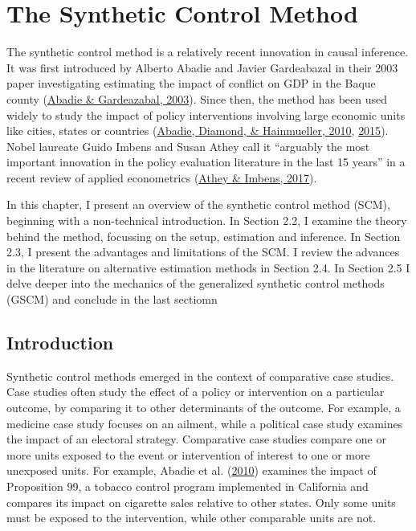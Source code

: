 \documentclass[12pt,nobind, a4paper]{reedthesis}
\begin{document}
 \hypertarget{the-synthetic-control-method}{%
 \chapter{The Synthetic Control Method}\label{the-synthetic-control-method}}

 The synthetic control method is a relatively recent innovation in causal inference. It was first introduced by Alberto Abadie and Javier Gardeabazal in their 2003 paper investigating estimating the impact of conflict on GDP in the Baque county (\protect\hyperlink{ref-abadie_economic_2003}{Abadie \& Gardeazabal, 2003}). Since then, the method has been used widely to study the impact of policy interventions involving large economic units like cities, states or countries (\protect\hyperlink{ref-abadie_synthetic_2010}{Abadie, Diamond, \& Hainmueller, 2010}, \protect\hyperlink{ref-abadie_comparative_2015}{2015}). Nobel laureate Guido Imbens and Susan Athey call it ``arguably the most important innovation in the policy evaluation literature in the last 15 years'' in a recent review of applied econometrics (\protect\hyperlink{ref-athey_state_2017}{Athey \& Imbens, 2017}).
 \linebreak

 In this chapter, I present an overview of the synthetic control method (SCM), beginning with a non-technical introduction. In Section 2.2, I examine the theory behind the method, focussing on the setup, estimation and inference. In Section 2.3, I present the advantages and limitations of the SCM. I review the advances in the literature on alternative estimation methods in Section 2.4. In Section 2.5 I delve deeper into the mechanics of the generalized synthetic control methods (GSCM) and conclude in the last sectiomn

 \hypertarget{introduction-1}{%
 \section{Introduction}\label{introduction-1}}

 Synthetic control methods emerged in the context of comparative case studies. Case studies often study the effect of a policy or intervention on a particular outcome, by comparing it to other determinants of the outcome. For example, a medicine case study focuses on an ailment, while a political case study examines the impact of an electoral strategy. Comparative case studies compare one or more units exposed to the event or intervention of interest to one or more unexposed units. For example, Abadie et al. (\protect\hyperlink{ref-abadie_synthetic_2010}{2010}) examines the impact of Proposition 99, a tobacco control program implemented in California and compares its impact on cigarette sales relative to other states. Only some units must be exposed to the intervention, while other comparable units are not.
 \linebreak
\end{document}
